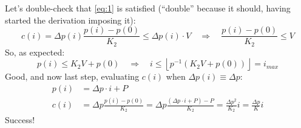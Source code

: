 \documentclass[10pt,a4paper]{article}
\begin{document}
	Let’s double-check that \ref{eq:1} is satisfied (\enquote{double} because it should, having started the derivation imposing it):
	\begin{equation*}
		c(i)=\Delta p(i) \frac{p(i)-p(0)}{K_{2}} \leq \Delta p(i) \cdot V \quad \Longrightarrow \quad \frac{p(i)-p(0)}{K_{2}} \leq V
	\end{equation*}
	So, as expected:
	\begin{equation*}
		p(i) \leq K_{2}V+p(0) \quad \Longrightarrow \quad i \leq \left\lfloor p^{-1}(K_{2}V+p(0)) \right\rfloor = i_{max}
	\end{equation*}
	Good, and now last step, evaluating $c(i)$ when $\Delta p(i) \equiv \Delta p$:
	\begin{align*}
			p(i) &= \Delta p \cdot i + P\\
			c(i) &= \Delta p \frac{p(i)-p(0)}{K_{2}}=\Delta p \frac{(\Delta p \cdot i + P)-P}{K_{2}} = \frac{\Delta p^{2}}{K_{2}}i = \frac{\Delta p}{K}i
	\end{align*}
	Success!
\end{document}
